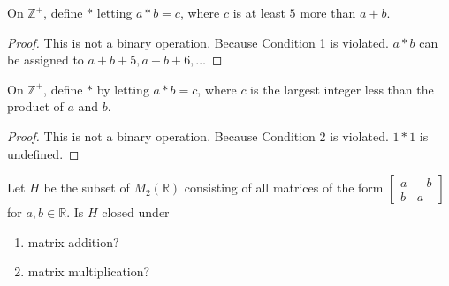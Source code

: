 \begin{exercise}
    On $\mathbb{Z}^{+}$, define $*$ letting $a * b = c$, where $c$ is at least $5$ more than $a + b$.
\end{exercise}

\begin{proof}
    This is not a binary operation. Because Condition 1 is violated. $a * b$ can be assigned to $a + b + 5, a + b + 6, \ldots$
\end{proof}

\begin{exercise}
    On $\mathbb{Z}^{+}$, define $*$ by letting $a * b = c$, where $c$ is the largest integer less than the product of $a$ and $b$.
\end{exercise}

\begin{proof}
    This is not a binary operation. Because Condition 2 is violated. $1 * 1$ is undefined.
\end{proof}

\begin{exercise}
    Let $H$ be the subset of $M_{2}(\mathbb{R})$ consisting of all matrices of the form $\begin{bmatrix}a & -b \\ b & a\end{bmatrix}$ for $a, b\in\mathbb{R}$. Is $H$ closed under
    \begin{enumerate}[label={\textbf{\alph*}}]
        \item matrix addition?
        \item matrix multiplication?
    \end{enumerate}
\end{exercise}

